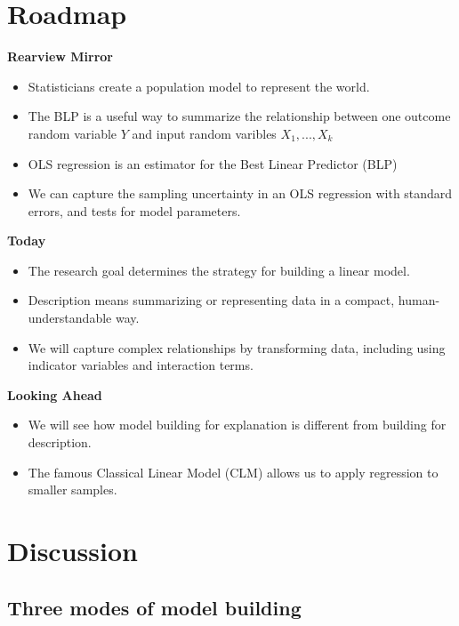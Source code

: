 \documentclass[
]{book}
\theoremstyle{definition}
\theoremstyle{definition}
\theoremstyle{definition}
\theoremstyle{definition}
\theoremstyle{remark}
\begin{document}
\hypertarget{roadmap-6}{%
\section{Roadmap}\label{roadmap-6}}

\textbf{Rearview Mirror}

\begin{itemize}
\item
  Statisticians create a population model to represent the world.
\item
  The BLP is a useful way to summarize the relationship between one outcome random variable \(Y\) and input random varibles \(X_1,...,X_k\)
\item
  OLS regression is an estimator for the Best Linear Predictor (BLP)
\item
  We can capture the sampling uncertainty in an OLS regression with standard errors, and tests for model parameters.
\end{itemize}

\textbf{Today}

\begin{itemize}
\item
  The research goal determines the strategy for building a linear model.
\item
  Description means summarizing or representing data in a compact, human-understandable way.
\item
  We will capture complex relationships by transforming data, including using indicator variables and interaction terms.
\end{itemize}

\textbf{Looking Ahead}

\begin{itemize}
\item
  We will see how model building for explanation is different from building for description.
\item
  The famous Classical Linear Model (CLM) allows us to apply regression to smaller samples.
\end{itemize}

\hypertarget{discussion}{%
\section{Discussion}\label{discussion}}

\hypertarget{three-modes-of-model-building}{%
\subsection{Three modes of model building}\label{three-modes-of-model-building}}
\end{document}
